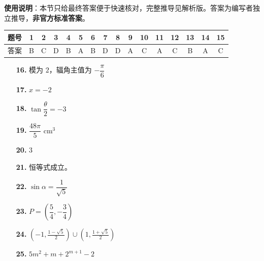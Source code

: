 
\begin{gknotice}
\textbf{使用说明}：本节只给最终答案便于快速核对，完整推导见解析版。答案为编写者独立推导，\textbf{非官方标准答案}。
\end{gknotice}

\begin{center}\begin{tabular}{cccccccccccccccc}
\toprule
题号 & 1 & 2 & 3 & 4 & 5 & 6 & 7 & 8 & 9 & 10 & 11 & 12 & 13 & 14 & 15 \\
\midrule
答案 & B & C & D & B & A & B & D & D & A & C & A & C & B & A & C \\
\bottomrule
\end{tabular}\end{center}

\begin{itemize}[leftmargin=2.6em]
  \item[\textbf{16.}] 模为 $2$，辐角主值为 $-\dfrac\pi6$
  \item[\textbf{17.}] $x=-2$
  \item[\textbf{18.}] $\tan\dfrac\theta2=-3$
  \item[\textbf{19.}] $\dfrac{48\pi}{5}\text{ cm}^3$
  \item[\textbf{20.}] $3$
  \item[\textbf{21.}] 恒等式成立。
  \item[\textbf{22.}] $\sin\alpha=\dfrac1{\sqrt5}$
  \item[\textbf{23.}] $P=\left(\dfrac54,-\dfrac34\right)$
  \item[\textbf{24.}] $\displaystyle\left(-1,\frac{1-\sqrt5}{2}\right)\cup\left(1,\frac{1+\sqrt5}{2}\right)$
  \item[\textbf{25.}] $5m^2+m+2^{m+1}-2$
\end{itemize}
